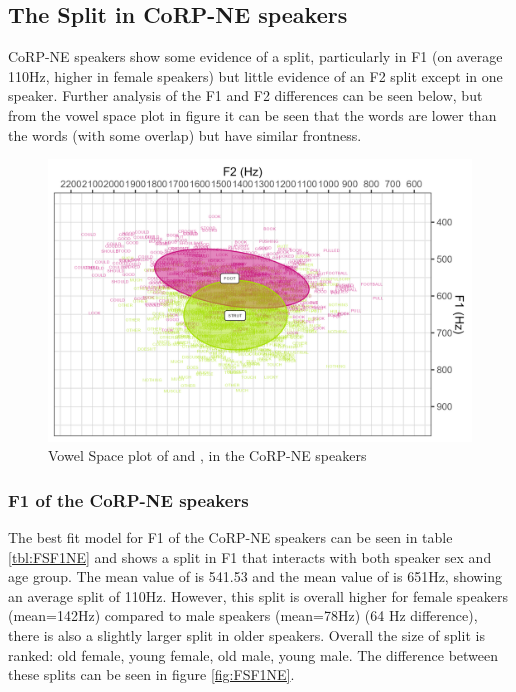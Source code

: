 \documentclass[../../../00.FullDoc/tex/APRReport-year4]{subfiles}
\begin{document}
\subsection{The  Split in CoRP-NE speakers} \label{subsec:FSNE}
CoRP-NE speakers show some evidence of a \FS{} split, particularly in F1 (on average 110Hz, higher in female speakers) but little evidence of an F2 split except in one speaker. Further analysis of the F1 and F2 differences can be seen below, but from the vowel space plot in figure it can be seen that the \strutt{} words are lower than the \foot{} words (with some overlap) but have similar frontness.

\begin{figure}[h]
	\includegraphics[width=\textwidth]{../figures/FS-NE-vplot.png}
	\caption{Vowel Space plot of \foot{} and \strutt{}, in the CoRP-NE speakers} \label{fig:FSvplotNE}
\end{figure}


\subsubsection{F1 of the CoRP-NE speakers} \label{subsubsec:NEF1}

The best fit model for F1 of the CoRP-NE speakers can be seen in table \ref{tbl:FSF1NE} and shows a \FS{} split in F1 that interacts with both speaker sex and age group. The mean value of \foot{} is 541.53 and the mean value of \strutt{} is 651Hz, showing an average split of 110Hz. However, this split is overall higher for female speakers (mean=142Hz) compared to male speakers (mean=78Hz) (64 Hz difference), there is also a slightly larger split in older speakers. Overall the size of split is ranked: old female, young female, old male, young male. The difference between these splits can be seen in figure \ref{fig:FSF1NE}.
\end{document}
